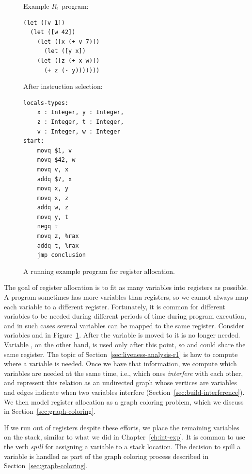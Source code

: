 \documentclass[11pt]{book}
\begin{document}
\begin{figure}
\begin{minipage}{0.45\textwidth}
Example $R_1$ program:
\begin{lstlisting}
(let ([v 1])
  (let ([w 42])
    (let ([x (+ v 7)])
      (let ([y x])
	(let ([z (+ x w)])
	  (+ z (- y)))))))
\end{lstlisting}
\end{minipage}
\begin{minipage}{0.45\textwidth}
After instruction selection:
\begin{lstlisting}
locals-types:
    x : Integer, y : Integer,
    z : Integer, t : Integer,
    v : Integer, w : Integer
start:
    movq $1, v
    movq $42, w
    movq v, x
    addq $7, x
    movq x, y
    movq x, z
    addq w, z
    movq y, t
    negq t
    movq z, %rax
    addq t, %rax
    jmp conclusion
\end{lstlisting}
\end{minipage}
\caption{A running example program for register allocation.}
\label{fig:reg-eg}
\end{figure}

The goal of register allocation is to fit as many variables into
registers as possible. A program sometimes has more variables than
registers, so we cannot always map each variable to a different
register. Fortunately, it is common for different variables to be
needed during different periods of time during program execution, and
in such cases several variables can be mapped to the same register.
Consider variables  and  in Figure~\ref{fig:reg-eg}.
After the variable  is moved to  it is no longer
needed.  Variable , on the other hand, is used only after this
point, so  and  could share the same register. The
topic of Section~\ref{sec:liveness-analysis-r1} is how to compute
where a variable is needed.  Once we have that information, we compute
which variables are needed at the same time, i.e., which ones
\emph{interfere} with each other, and represent this relation as an
undirected graph whose vertices are variables and edges indicate when
two variables interfere (Section~\ref{sec:build-interference}). We
then model register allocation as a graph coloring problem, which we
discuss in Section~\ref{sec:graph-coloring}.

If we run out of registers despite these efforts, we place the
remaining variables on the stack, similar to what we did in
Chapter~\ref{ch:int-exp}. It is common to use the verb \emph{spill}
for assigning a variable to a stack location. The decision to spill a
variable is handled as part of the graph coloring process described in
Section~\ref{sec:graph-coloring}.
\end{document}
